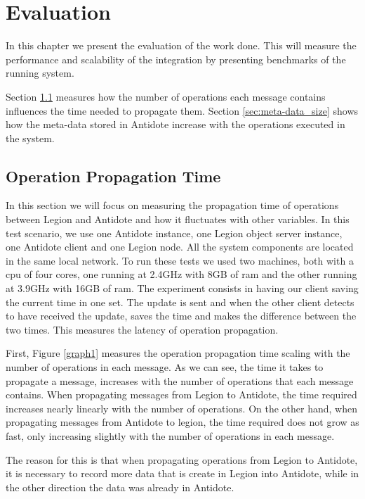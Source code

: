 \chapter{Evaluation}
\label{cha:evaluation}
In this chapter we present the evaluation of the work done. This will measure the performance and scalability of the integration by presenting benchmarks of the running system.\par
	Section \ref{sec:operation_propagation_time} measures how the number of operations each message contains influences the time needed to propagate them. Section \ref{sec:meta-data_size} shows how the meta-data stored in Antidote increase with the operations executed in the system.

\section{Operation Propagation Time}
\label{sec:operation_propagation_time}
In this section we will focus on measuring the propagation time of operations between Legion and Antidote and how it fluctuates with other variables. In this test scenario, we use one Antidote instance, one Legion object server instance, one Antidote client and one Legion node. All the system components are located in the same local network. To run these tests we used two machines, both with a cpu of four cores, one running at 2.4GHz with 8GB of ram and the other running at 3.9GHz with 16GB of ram. The experiment consists in having our client saving the current time in one set. The update is sent and when the other client detects to have received the update, saves the time and makes the difference between the two times. This measures the latency of operation propagation.\par
	First, Figure \ref{graph1} measures the operation propagation time scaling with the number of operations in each message. As we can see, the time it takes to propagate a message, increases with the number of operations that each message contains. When propagating messages from Legion to Antidote, the time required increases nearly linearly with the number of operations. On the other hand, when propagating messages from Antidote to legion, the time required does not grow as fast, only increasing slightly with the number of operations in each message.\par
	The reason for this is that when propagating operations from Legion to Antidote, it is necessary to record more data that is create in Legion into Antidote, while in the other direction the data was already in Antidote.

